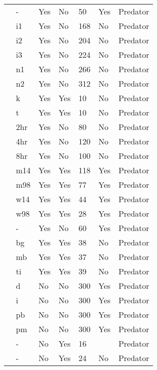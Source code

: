 \begin{table}[!tbp]
\begin{center}
\begin{tabular}{lllllll}
\citet{Salt:1974aa}&-&Yes&No&50&Yes&Predator\tabularnewline
\citet{Uttley:1980aa}&i1&Yes&No&168&No&Predator\tabularnewline
\citet{Uttley:1980aa}&i2&Yes&No&204&No&Predator\tabularnewline
\citet{Uttley:1980aa}&i3&Yes&No&224&No&Predator\tabularnewline
\citet{Uttley:1980aa}&n1&Yes&No&266&No&Predator\tabularnewline
\citet{Uttley:1980aa}&n2&Yes&No&312&No&Predator\tabularnewline
\citet{Vahl:2005aa}&k&Yes&Yes&10&No&Predator\tabularnewline
\citet{Vahl:2005aa}&t&Yes&Yes&10&No&Predator\tabularnewline
\citet{Von-Westernhagen:1976aa}&2hr&Yes&No&80&No&Predator\tabularnewline
\citet{Von-Westernhagen:1976aa}&4hr&Yes&No&120&No&Predator\tabularnewline
\citet{Von-Westernhagen:1976aa}&8hr&Yes&No&100&No&Predator\tabularnewline
\citet{Vucetich:2002aa}&m14&Yes&Yes&118&Yes&Predator\tabularnewline
\citet{Vucetich:2002aa}&m98&Yes&Yes&77&Yes&Predator\tabularnewline
\citet{Vucetich:2002aa}&w14&Yes&Yes&44&Yes&Predator\tabularnewline
\citet{Vucetich:2002aa}&w98&Yes&Yes&28&Yes&Predator\tabularnewline
\citet{Walde:1984aa}&-&Yes&No&60&Yes&Predator\tabularnewline
\citet{Wasserman:2016aa}&bg&Yes&Yes&38&No&Predator\tabularnewline
\citet{Wasserman:2016aa}&mb&Yes&Yes&37&No&Predator\tabularnewline
\citet{Wasserman:2016aa}&ti&Yes&Yes&39&No&Predator\tabularnewline
\citet{Elliott:2003aa}&d&No&No&300&Yes&Predator\tabularnewline
\citet{Elliott:2003aa}&i&No&No&300&Yes&Predator\tabularnewline
\citet{Elliott:2003aa}&pb&No&No&300&Yes&Predator\tabularnewline
\citet{Elliott:2003aa}&pm&No&No&300&Yes&Predator\tabularnewline
\citet{Hebblewhite:2013aa}&-&No&Yes&16&&Predator\tabularnewline
\citet{Stier:2013aa}&-&No&Yes&24&No&Predator\tabularnewline
\hline
\end{tabular}\end{center}
\end{table}
